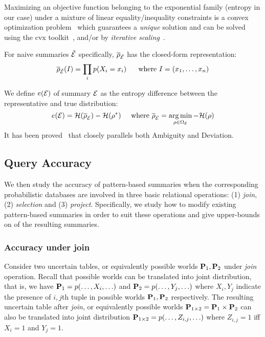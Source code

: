 Maximizing an objective function belonging to the exponential family (entropy in our case) under a mixture of linear equality/inequality constraints is a convex optimization problem~\cite{Boyd:2004:CO:993483} which guarantees a \emph{unique} solution and can be solved using the cvx toolkit~\cite{cvx}, and/or by \textit{iterative scaling}~\cite{DBLP:journals/tkdd/MampaeyVT12,DBLP:journals/pvldb/GebalyAGKS14}.

For naive summaries $\ddot{\mathcal E}$ specifically, $\overline{\rho}_{\ddot{\mathcal E}}$ has the closed-form representation:
\begin{equation*}
\overline{\rho}_{\ddot{\mathcal E}}(I)=\prod_{i}p(X_i=x_i)\;\;\;\;\;\;\text{where } I=(x_1,\ldots,x_n)
\end{equation*} 

\tinysection{\Errorname}
We define \emph{\Errorname} $e(\mathcal E)$ of summary $\mathcal E$ as the entropy difference between the representative and true distribution:
$$e(\mathcal E)=\mathcal{H}(\overline{\rho}_\mathcal E)-\mathcal{H}(\rho^*)\;\;\;\;\;\text{where }\overline{\rho}_\mathcal E=\operatorname*{arg\,min}\limits_{\rho\in\Omega_\mathcal E}-\mathcal{H}(\rho)$$
It has been proved~\cite{xie2018query} that \Errorname closely parallels both Ambiguity and Deviation. 

\subsection{Query Accuracy} 
We then study the accuracy of pattern-based summaries when the corresponding probabilistic databases are involved in three basic relational operations: (1) \emph{join}, (2) \emph{selection} and (3) \emph{project}.
Specifically, we study how to modify existing pattern-based summaries in order to suit these operations and give upper-bounds on \Errorname of the resulting summaries.

\subsubsection{Accuracy under join}
Consider two uncertain tables, or equivalently possible worlds $\mathbf{P}_1, \mathbf{P}_2$ under \emph{join} operation.
Recall that possible worlds can be translated into joint distribution, that is, we have $\mathbf{P}_1=p(\ldots,X_i,\ldots)$ and $\mathbf{P}_2=p(\ldots,Y_j,\ldots)$ where $X_i,Y_j$ indicate the presence of $i,j$th tuple in possible worlds $\mathbf{P}_1,\mathbf{P}_2$ respectively.
The resulting uncertain table after \emph{join}, or equivalently possible worlds $\mathbf{P}_{1\times 2}=\mathbf{P}_1\times\mathbf{P}_2$ can also be translated into joint distribution $\mathbf{P}_{1\times 2}=p(\ldots,Z_{i,j},\ldots)$ where $Z_{i,j}=1$ iff $X_i=1$ and $Y_j=1$.

